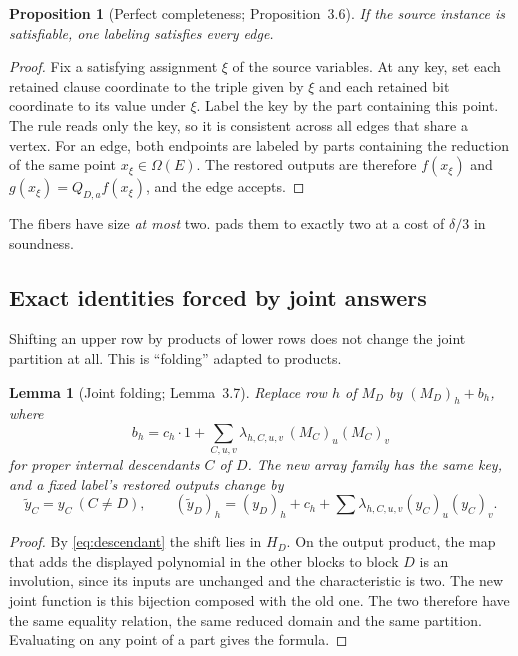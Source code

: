\documentclass[11pt]{article}
\newtheorem{lemma}[theorem]{Lemma}
\newtheorem{proposition}[theorem]{Proposition}
\theoremstyle{definition}
\theoremstyle{remark}
\begin{document}
\begin{proposition}[Perfect completeness; Proposition~3.6]\label{prop:completeness}
If the source instance is satisfiable, one labeling satisfies every edge.
\end{proposition}

\begin{proof}
Fix a satisfying assignment $\xi$ of the source variables. At any key, set
each retained clause coordinate to the triple given by $\xi$ and each
retained bit coordinate to its value under $\xi$. Label the key by the part
containing this point. The rule reads only the key, so it is consistent
across all edges that share a vertex. For an edge, both endpoints are labeled
by parts containing the reduction of the same point $x_\xi\in\Omega(E)$. The
restored outputs are therefore $f(x_\xi)$ and $g(x_\xi)=Q_{D,a}f(x_\xi)$, and
the edge accepts.
\end{proof}

The fibers have size \emph{at most} two.  pads them to
exactly two at a cost of $\delta/3$ in soundness.

\subsection{Exact identities forced by joint answers}\label{sec:identities}

Shifting an upper row by products of lower rows does not change the joint
partition at all. This is ``folding'' adapted to products.

\begin{lemma}[Joint folding; Lemma~3.7]\label{lem:folding}
Replace row $h$ of $M_D$ by $(M_D)_h+b_h$, where
\[
 b_h=c_h\cdot1+\sum_{C,u,v}\lambda_{h,C,u,v}\,(M_C)_u(M_C)_v
\]
for proper internal descendants $C$ of $D$. The new array family has
\emph{the same key}, and a fixed label's restored outputs change by
\[
 \widetilde y_C=y_C\ (C\neq D),\qquad
 (\widetilde y_D)_h=(y_D)_h+c_h+\sum\lambda_{h,C,u,v}(y_C)_u(y_C)_v.
\]
\end{lemma}

\begin{proof}
By \eqref{eq:descendant} the shift lies in $H_D$. On the output product, the
map that adds the displayed polynomial in the other blocks to block $D$ is an
involution, since its inputs are unchanged and the characteristic is two. The
new joint function is this bijection composed with the old one. The two
therefore have the same equality relation, the same reduced domain and the
same partition. Evaluating on any point of a part gives the formula.
\end{proof}
\end{document}
